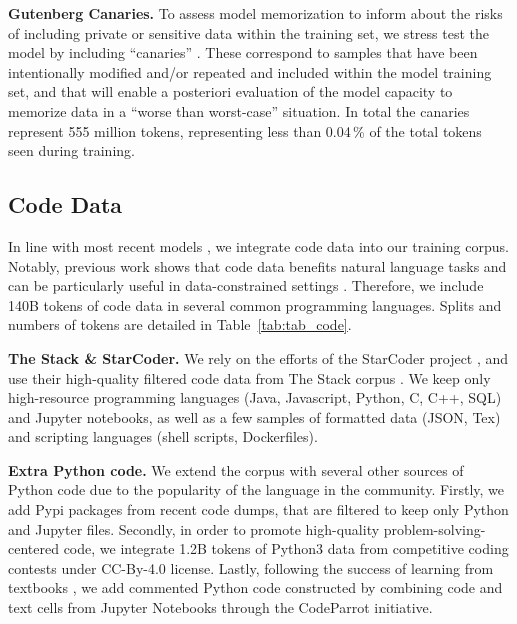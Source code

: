 \textbf{Gutenberg Canaries.} To assess model memorization to inform about the risks of including private or sensitive data within the training set, we stress test the model by including ``canaries'' . These correspond to samples that have been intentionally modified and/or repeated and included within the model training set, and that will enable a posteriori evaluation of the model capacity to memorize data in a ``worse than worst-case'' situation. In total the canaries represent 555 million tokens, representing less than 0.04\,\% of the total tokens seen during training.




\subsection{Code Data}

In line with most recent models \cite{chowdhery2022palm, scao2022bloom, touvron2023llama}, we integrate code data into our training corpus. Notably, previous work shows that code data benefits natural language tasks and can be particularly useful in data-constrained settings . Therefore, we include 140B tokens of code data in several common programming languages.
Splits and numbers of tokens are detailed in Table~\ref{tab:tab_code}.

\textbf{The Stack \& StarCoder.} We rely on the efforts of the StarCoder project , and use their high-quality filtered code data from The Stack corpus .
We keep only high-resource programming languages (Java, Javascript, Python, C, C++, SQL) and Jupyter notebooks, as well as a few samples of formatted data (JSON, Tex) and scripting languages (shell scripts, Dockerfiles).


\textbf{Extra Python code.}
We extend the corpus with several other sources of Python code due to the popularity of the language in the community.
Firstly, we add Pypi packages from recent code dumps, that are filtered to keep only Python and Jupyter files.
Secondly, in order to promote high-quality problem-solving-centered code, we integrate 1.2B tokens of Python3 data from competitive coding contests  under CC-By-4.0 license.
Lastly, following the success of learning from textbooks , we add commented Python code constructed by combining code and text cells from Jupyter Notebooks through the CodeParrot initiative.



